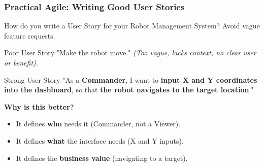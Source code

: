 \documentclass[xcolor=table]{beamer}
\begin{document}
\begin{frame}
    \frametitle{Practical Agile: Writing Good User Stories}
    How do you write a User Story for your Robot Management System? Avoid vague feature requests.
    
    \begin{alertblock}{Poor User Story}
        "Make the robot move." \textit{(Too vague, lacks context, no clear user or benefit).}
    \end{alertblock}

    \begin{exampleblock}{Strong User Story}
        "As a \textbf{Commander}, I want to \textbf{input X and Y coordinates into the dashboard}, so that \textbf{the robot navigates to the target location}."
    \end{exampleblock}
    
    \vspace{0.2cm}
    \textbf{Why is this better?}
    \begin{itemize}
        \item It defines \textbf{who} needs it (Commander, not a Viewer).
        \item It defines \textbf{what} the interface needs (X and Y inputs).
        \item It defines the \textbf{business value} (navigating to a target).
    \end{itemize}
\end{frame}
\end{document}
